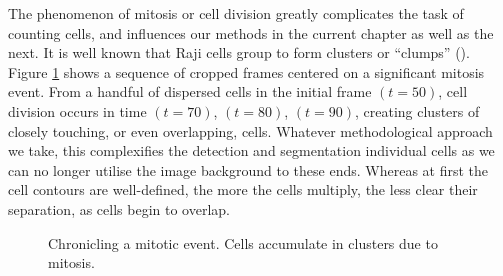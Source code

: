 The phenomenon of mitosis or cell division greatly complicates the task of counting cells, and influences our methods in the current chapter as well as the next. It is well known that Raji cells group to form clusters or ``clumps'' (\cite{epstein1966morphological}). Figure \ref{fig:mitosis_frames} shows a sequence of cropped frames centered on a significant mitosis event. From a handful of dispersed cells in the initial frame $(t = 50)$, cell division occurs in time $(t = 70)$, $(t = 80)$, $(t = 90)$, creating clusters of closely touching, or even overlapping, cells. Whatever methodological approach we take, this complexifies the detection and segmentation individual cells as we can no longer utilise the image background to these ends. Whereas at first the cell contours are well-defined, the more the cells multiply, the less clear their separation, as cells begin to overlap.

\begin{figure}[h]%
    \centering
    \qquad
    \qquad
	\qquad
\caption{Chronicling a mitotic event. Cells accumulate in clusters due to mitosis.}
\label{fig:mitosis_frames}
\end{figure}

